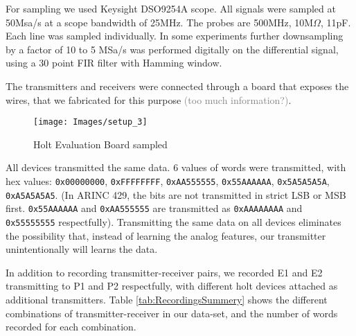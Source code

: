 \documentclass[conference]{IEEEtran}
\begin{document}
  For sampling we used Keysight DSO9254A scope. All signals were sampled at 50Msa/s at a scope bandwidth of 25MHz. The probes are 500MHz, 10M\(\Omega\), 11pF. Each line was sampled individually. In some experiments further downsampling by a factor of 10 to 5 MSa/s was performed digitally on the differential signal, using a 30 point FIR filter with Hamming window.
  
  The transmitters and receivers were connected through a board that exposes the wires, that we fabricated for this purpose \textcolor{gray}{(too much information?)}.
  
  \begin{figure}[t]
    \centering
    \texttt{[image: Images/setup\_3]}
    \caption{Holt Evaluation Board sampled}
    \label{fig:SetupImage}
  \end{figure}
  
  All devices transmitted the same data. 6 values of words were transmitted, with hex values: \texttt{0x00000000}, \texttt{0xFFFFFFFF}, \texttt{0xAA555555}, \texttt{0x55AAAAAA}, \texttt{0x5A5A5A5A}, \texttt{0xA5A5A5A5}. (In ARINC 429, the bits are not transmitted in strict LSB or MSB first. \texttt{0x55AAAAAA} and \texttt{0xAA555555} are transmitted as \texttt{0xAAAAAAAA} and \texttt{0x55555555} respectfully). Transmitting the same data on all devices eliminates the possibility that, instead of learning the analog features, our transmitter unintentionally will learns the data.
  
  In addition to recording transmitter-receiver pairs, we recorded E1 and E2 transmitting to P1 and P2 respectfully, with different holt devices attached as additional transmitters. Table \ref{tab:RecordingsSummery} shows the different combinations of transmitter-receiver in our data-set, and the number of words recorded for each combination.
  
\end{document}
